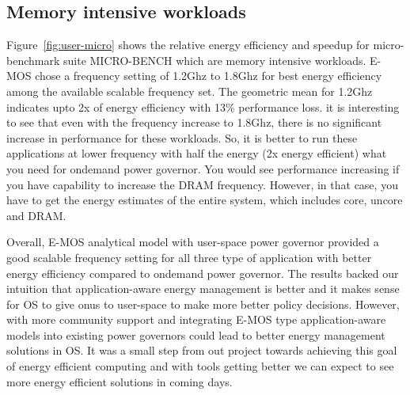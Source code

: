 \subsection{Memory intensive workloads}
Figure~\ref{fig:user-micro} shows the relative energy efficiency and speedup
for micro-benchmark suite MICRO-BENCH which are memory intensive workloads. 
E-MOS chose a frequency setting of 1.2Ghz to 1.8Ghz for best energy efficiency
among the available scalable frequency set. The geometric mean for 1.2Ghz indicates  
upto 2x of energy efficiency with  13\% performance loss. 
it is interesting to see that even with the frequency increase to 1.8Ghz, there is no significant 
increase in performance for these workloads. So, it is better to run these applications
at lower frequency with half the energy (2x energy efficient) what you need for ondemand power governor.
You would see performance increasing if you have capability to increase the DRAM frequency. However,
in that case, you have to get the energy estimates of the entire system, which includes core, uncore and DRAM.

Overall, E-MOS analytical model with user-space power governor provided a good scalable frequency setting for all three type of application
with better energy efficiency compared to ondemand power governor. The results backed 
our intuition that application-aware energy management is better and it makes
sense for OS to give onus to user-space to make more better policy decisions.
However, with more community support and integrating E-MOS type application-aware  models into 
existing power governors could lead to better energy management solutions in OS. It was a small step
from out project towards achieving this goal of energy efficient computing and with tools getting better
we can expect to see more energy efficient solutions in coming days.

